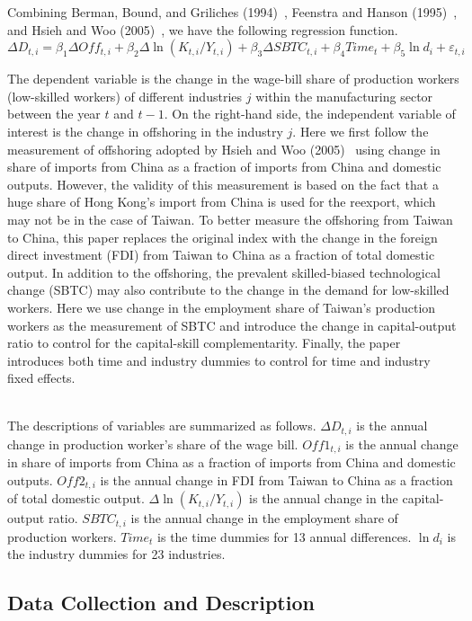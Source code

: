 \documentclass{article}
\begin{document}
Combining Berman, Bound, and Griliches (1994)~\cite{berman}, Feenstra and Hanson (1995)~\cite{feenstra}, and Hsieh and Woo (2005)~\cite{hsieh}, we have the following regression function.
$$\Delta D_{t,i}=\beta_1\Delta Off_{t,i}+\beta_2\Delta\ln(K_{t,i}/Y_{t,i})+\beta_3\Delta SBTC_{t,i}+\beta_4 Time_t+\beta_5\ln d_i+\varepsilon_{t,i}$$\par
The dependent variable is the change in the wage-bill share of production workers (low-skilled workers) of different industries $j$ within the manufacturing sector between the year $t$ and $t-1$. On the right-hand side, the independent variable of interest is the change in offshoring in the industry $j$. Here we first follow the measurement of offshoring adopted by Hsieh and Woo (2005)~\cite{hsieh} using change in share of imports from China as a fraction of imports from China and domestic outputs. However, the validity of this measurement is based on the fact that a huge share of Hong Kong’s import from China is used for the reexport, which may not be in the case of Taiwan. To better measure the offshoring from Taiwan to China, this paper replaces the original index with the change in the foreign direct investment (FDI) from Taiwan to China as a fraction of total domestic output. In addition to the offshoring, the prevalent skilled-biased technological change (SBTC) may also contribute to the change in the demand for low-skilled workers. Here we use change in the employment share of Taiwan’s production workers as the measurement of SBTC and introduce the change in capital-output ratio to control for the capital-skill complementarity. Finally, the paper introduces both time and industry dummies to control for time and industry fixed effects.\par\\
The descriptions of variables are summarized as follows. $\Delta D_{t,i}$ is the annual change in production worker's share of the wage bill. $Off1_{t,i}$ is the annual change in share of imports from China as a fraction of imports from China and domestic outputs. $Off2_{t,i}$ is the annual change in FDI from Taiwan to China as a fraction of total domestic output. $\Delta \ln (K_{t,i}/Y_{t,i})$ is the annual change in the capital-output ratio. $SBTC_{t,i}$ is the annual change in the employment share of production workers. $Time_t$ is the time dummies for 13 annual differences. $\ln d_i$ is the industry dummies for 23 industries.
\subsection{Data Collection and Description}
\end{document}
